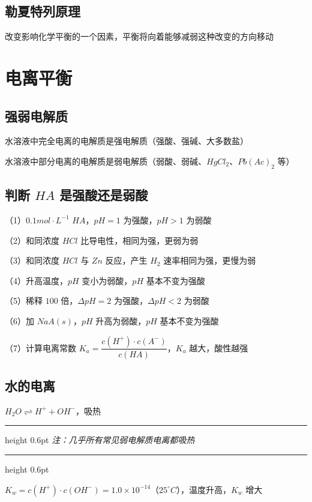 \documentclass[UTF8,zihao=-4,openany]{ctexbook}
\newenvironment{notebox}
  {\par\smallskip\noindent\begingroup\begin{minipage}{\linewidth}\color{noteframe}\hrule height 0.6pt\smallskip\color{black}\itshape}
  {\par\smallskip\color{noteframe}\hrule height 0.6pt\end{minipage}\endgroup\par\smallskip}
\begin{document}
\subsection{勒夏特列原理}
改变影响化学平衡的一个因素，平衡将向着能够减弱这种改变的方向移动\par
\section{电离平衡}
\subsection{强弱电解质}
水溶液中完全电离的电解质是强电解质（强酸、强碱、大多数盐）\par

水溶液中部分电离的电解质是弱电解质（弱酸、弱碱、$HgCl_2$、$Pb(Ac)_2$ 等）\par
\subsection{判断 $HA$ 是强酸还是弱酸}
（1）$0.1mol\cdot L^{-1}$ $HA$，$pH=1$ 为强酸，$pH>1$ 为弱酸\par

（2）和同浓度 $HCl$ 比导电性，相同为强，更弱为弱\par

（3）和同浓度 $HCl$ 与 $Zn$ 反应，产生 $H_2$ 速率相同为强，更慢为弱\par

（4）升高温度，$pH$ 变小为弱酸，$pH$ 基本不变为强酸\par

（5）稀释 $100$ 倍，$\Delta pH=2$ 为强酸，$\Delta pH<2$ 为弱酸\par

（6）加 $NaA(s)$，$pH$ 升高为弱酸，$pH$ 基本不变为强酸\par

（7）计算电离常数 $K_a=\dfrac{c(H^+)\cdot c(A^-)}{c(HA)}$，$K_a$ 越大，酸性越强\par
\subsection{水的电离}
$H_2O\rightleftharpoons H^++OH^-$，吸热\par

\begin{notebox}
注：几乎所有常见弱电解质电离都吸热\par
\end{notebox}
$K_w=c(H^+)\cdot c(OH^-)=1.0\times10^{-14}$（$25^{\circ}C$），温度升高，$K_w$ 增大\par
\end{document}
